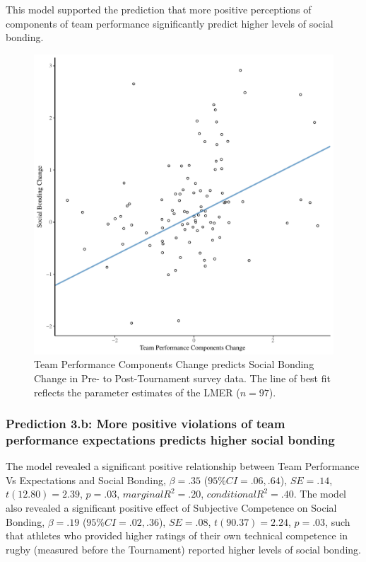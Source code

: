 \begin{CJK}{UTF8}{gbsn}
This model supported the prediction that more positive perceptions of components of team performance significantly predict higher levels of social bonding.


  \begin{figure}[htbp]
    \centering
  \includegraphics[scale=.5]{images/jasBondDeltaModelSlope.pdf}
    \caption{Team Performance Components Change predicts Social Bonding Change in Pre- to Post-Tournament survey data. The line of best fit reflects the parameter estimates of the LMER ($n = 97$).}
    \label{fig:jasBondDeltaModelSlope}
  \end{figure}













\subsubsection{Prediction 3.b: More positive violations of team performance expectations predicts higher social bonding}
The model revealed a significant positive relationship between Team Performance Vs Expectations and Social Bonding, $\beta = .35$ ($95\% CI = .06, .64$), $SE = .14$, $t(12.80) = 2.39$, $p = .03$, $marginal R^2 = .20$, $conditional R^2 = .40$.  The model also revealed a significant positive effect of Subjective Competence on Social Bonding, $\beta = .19$ ($95\% CI =  .02, .36$), $SE = .08$, $t(90.37) = 2.24$, $p = .03$, such that athletes who provided higher ratings of their own technical competence in rugby (measured before the Tournament) reported higher levels of social bonding.


\end{CJK}
